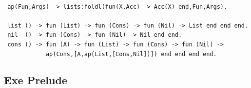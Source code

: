 \documentclass[11pt,oneside]{article}
\begin{document}
\begin{lstlisting}[mathescape=true]

 ap(Fun,Args) -> lists:foldl(fun(X,Acc) -> Acc(X) end,Fun,Args).

 list () -> fun (List) -> fun (Cons) -> fun (Nil) -> List end end end.
 nil  () -> fun (Cons) -> fun (Nil) -> Nil end end.
 cons () -> fun (A) -> fun (List) -> fun (Cons) -> fun (Nil) -> 
            ap(Cons,[A,ap(List,[Cons,Nil])]) end end end end.
\end{lstlisting}

\newpage

  \subsection{Exe Prelude}
\vspace{1cm}
\paragraph{}
\end{document}
